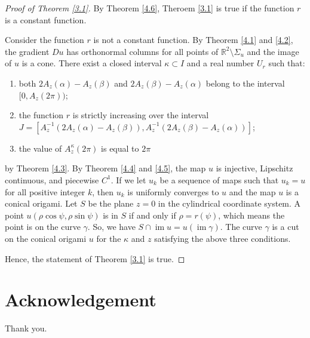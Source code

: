 \documentclass{amsart}
\theoremstyle{plain}
\theoremstyle{definition}
\theoremstyle{remark}
\DeclareMathOperator{\im}{im}
\begin{document}
\begin{proof}[Proof of Theorem \ref{3.1}]%
By Theorem \ref{4.6}, Theroem \ref{3.1} is true if the function $r$ is a constant function.

Consider the function $r$ is not a constant function.
By Theorem \ref{4.1} and \ref{4.2}, the gradient $Du$ has orthonormal columns for all points of $\mathbb{R}^2\setminus\Sigma_u$ and the image of $u$ is a cone.
There exist a closed interval $\kappa\subset I$ and a real number $U_r$ such that:
\begin{enumerate}
\item both $2A_z(\alpha)-A_z(\beta)$ and $2A_z(\beta)-A_z(\alpha)$ belong to the interval $[0,A_z(2\pi))$;
\item the function $r$ is strictly increasing over the interval $J=[A_z^{-1}(2A_z(\alpha)-A_z(\beta)),A_z^{-1}(2A_z(\beta)-A_z(\alpha))]$;
\item the value of $A_z^{\kappa}(2\pi)$ is equal to $2\pi$
\end{enumerate}
by Theorem \ref{4.3}.
By Theorem \ref{4.4} and \ref{4.5}, the map $u$ is injective, Lipschitz continuous, and piecewise $C^1$.
If we let $u_k$ be a sequence of maps such that $u_k=u$ for all positive integer $k$, then $u_k$ is uniformly converges to $u$ and the map $u$ is a conical origami.
Let $S$ be the plane $z=0$ in the cylindrical coordinate system.
A point $u(\rho\cos\psi,\rho\sin\psi)$ is in $S$ if and only if $\rho=r(\psi)$, which means the point is on the curve $\gamma$.
So, we have $S\cap\im u=u(\im\gamma)$.
The curve $\gamma$ is a cut on the conical origami $u$ for the $\kappa$ and $z$ satisfying the above three conditions.

Hence, the statement of Theorem \ref{3.1} is true.
\end{proof}

\section*{Acknowledgement}
Thank you.




\end{document}

